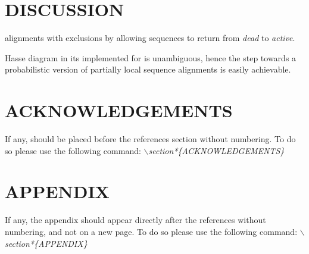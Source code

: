 \documentclass[a4paper,10pt]{article}
\newcommand{\TODO}[1]{\begingroup\color{red}#1\endgroup}
\begin{document}
\section{\uppercase{Discussion}}

\TODO{alignments with exclusions by allowing sequences to return from \emph{dead} to 
\emph{active}. }

\TODO{Hasse diagram in its implemented for is unambiguous, hence the step towards 
a probabilistic version of partially local sequence alignments is easily achievable.}

\section*{\uppercase{Acknowledgements}}

\noindent If any, should be placed before the references section
without numbering. To do so please use the following command:
\textit{$\backslash$section*\{ACKNOWLEDGEMENTS\}}


\vfill

{\small
}


\section*{\uppercase{Appendix}}

\noindent If any, the appendix should appear directly after the
references without numbering, and not on a new page. To do so please use the following command:
\textit{$\backslash$section*\{APPENDIX\}}

\vfill
\end{document}
